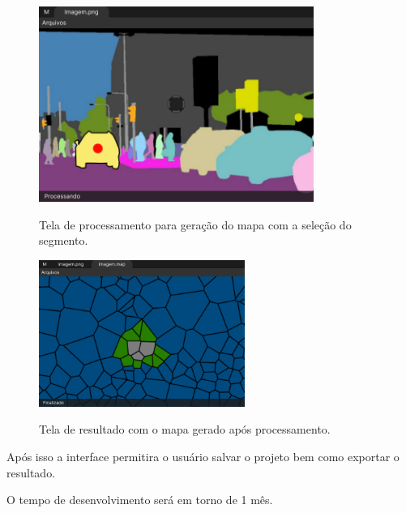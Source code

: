 \begin{figure}[H]
	\centering
    \caption{Tela de processamento para geração do mapa com a seleção do segmento.}
	\includegraphics[width=0.8\textwidth]{figures/tela_processando_2.png}
	\label{fig:tela_processando_2}
\end{figure}


\begin{figure}[H]
	\centering
    \caption{Tela de resultado com o mapa gerado após processamento.}
	\includegraphics[width=0.6\textwidth]{figures/tela_mapa.png}
	\label{fig:tela_mapa}
\end{figure}

Após isso a interface permitira o usuário salvar o projeto bem como exportar o resultado.

O tempo de desenvolvimento será em torno de 1 mês.

